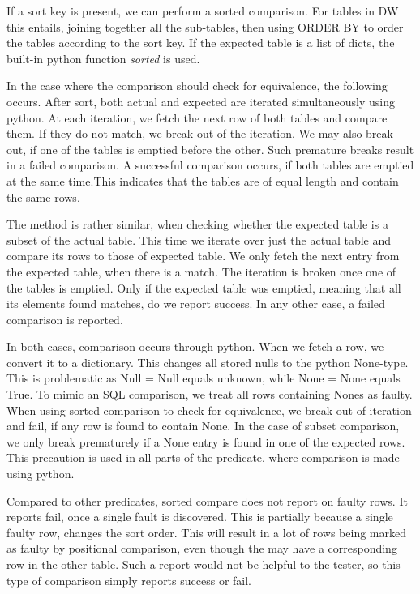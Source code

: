 If a sort key is present, we can perform a sorted comparison. For tables in DW this entails, joining together all the sub-tables, then using ORDER BY to order the tables according to the sort key. If the expected table is a list of dicts, the built-in python function \textit{sorted} is used. 


In the case where the comparison should check for equivalence, the following occurs. After sort, both actual and expected are iterated simultaneously using python. At each iteration, we fetch the next row of both tables and compare them. If they do not match, we break out of the iteration. We may also break out, if one of the tables is emptied before the other. Such premature breaks result in a failed comparison. A successful comparison occurs, if both tables are emptied at the same time.This indicates that the tables are of equal length and contain the same rows.

The method is rather similar, when checking whether the expected table is a subset of the actual table. This time we iterate over just the actual table and compare its rows to those of expected table. We only fetch the next entry from the expected table, when there is a match. The iteration is broken once one of the tables is emptied. Only if the expected table was emptied, meaning that all its elements found matches, do we report success. In any other case, a failed comparison is reported.

In both cases, comparison occurs through python. When we fetch a row, we convert it to a dictionary. This changes all stored nulls to the python None-type. This is problematic as Null = Null equals unknown, while None = None equals True. To mimic an SQL comparison, we treat all rows containing Nones as faulty.  When using sorted comparison to check for equivalence, we break out of iteration and fail, if any row is found to contain None. In the case of subset comparison, we only break prematurely if a None entry is found in one of the expected rows. This precaution is used in all parts of the predicate, where comparison is made using python.

Compared to other predicates, sorted compare does not report on faulty rows. It reports fail, once a single fault is discovered.  This is partially because  a single faulty row, changes the sort order. This will result in a lot of rows being marked as faulty by positional comparison, even though the may have a corresponding row in the other table. Such a report would not be helpful to the tester, so this type of comparison simply reports success or fail.

